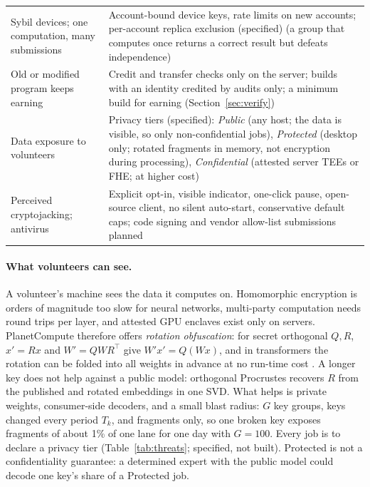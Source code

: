 \documentclass[11pt,a4paper]{article}
\theoremstyle{definition}
\theoremstyle{plain}
\begin{document}
\begin{table}[ht]
\begin{tabularx}{\linewidth}{@{}>{\raggedright\arraybackslash}p{3.6cm}X@{}}
Sybil devices; one computation, many submissions & Account-bound device keys, rate limits on new accounts; per-account replica exclusion (specified) (a group that computes once returns a correct result but defeats independence) \\
Old or modified program keeps earning & Credit and transfer checks only on the server; builds with an identity credited by audits only; a minimum build for earning (Section~\ref{sec:verify}) \\
Data exposure to volunteers        & Privacy tiers (specified): \emph{Public} (any host; the data is visible, so only non-confidential jobs), \emph{Protected} (desktop only; rotated fragments in memory, not encryption during processing), \emph{Confidential} (attested server TEEs or FHE; at higher cost) \\
Perceived cryptojacking; antivirus & Explicit opt-in, visible indicator, one-click pause, open-source client, no silent auto-start, conservative default caps; code signing and vendor allow-list submissions planned \\
\bottomrule
\end{tabularx}
\end{table}

\paragraph{What volunteers can see.} A volunteer's machine sees the data it computes on. Homomorphic encryption is
orders of magnitude too slow for neural networks, multi-party computation needs round trips per layer, and attested
GPU enclaves exist only on servers. PlanetCompute therefore offers
\emph{rotation obfuscation}: for secret orthogonal $Q,R$, $x'=Rx$ and $W'=QWR^{\top}$ give $W'x'=Q(Wx)$, and in
transformers the rotation can be folded into all weights in advance at no run-time cost
\citep{ashkboos2024slicegpt,ashkboos2024quarot}. A longer key does not help against a public model: orthogonal
Procrustes recovers $R$ from the published and rotated embeddings in one SVD. What helps is private weights, consumer-side decoders, and a small blast radius: $G$ key groups, keys changed every period
$T_k$, and fragments only, so one broken key exposes fragments of about 1\% of one lane for one day with $G=100$.
Every job is to declare a privacy tier (Table~\ref{tab:threats}; specified, not built). Protected is not a confidentiality guarantee: a
determined expert with the public model could decode one key's share of a Protected job.
\end{document}

